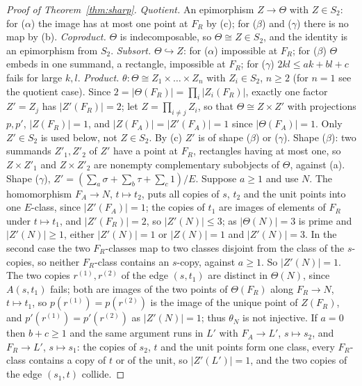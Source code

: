\documentclass[11pt]{amsart}
\theoremstyle{definition}
\begin{document}
\begin{proof}[Proof of Theorem~\ref{thm:sharp}]
\emph{Quotient.} An epimorphism $Z\to\Theta$ with $Z\in S_2$: for
($\alpha$) the image has at most one point at $F_R$ by (c); for ($\beta$)
and ($\gamma$) there is no map by (b).
\emph{Coproduct.} $\Theta$ is indecomposable, so $\Theta\cong Z\in S_2$,
and the identity is an epimorphism from $S_2$.
\emph{Subsort.} $\Theta\hookrightarrow Z$: for ($\alpha$) impossible at
$F_R$; for ($\beta$) $\Theta$ embeds in one summand, a rectangle, impossible at $F_R$;
for ($\gamma$) $2kl\le ak+bl+c$ fails for large $k,l$.
\emph{Product.} $\theta\colon\Theta\cong Z_1\times\dots\times Z_n$ with
$Z_i\in S_2$, $n\ge2$ (for $n=1$ see the quotient case). Since
$2=|\Theta(F_R)|=\prod_i|Z_i(F_R)|$, exactly one factor $Z'=Z_j$ has
$|Z'(F_R)|=2$; let $Z=\prod_{i\ne j}Z_i$, so that $\Theta\cong Z\times
Z'$ with projections $p,p'$, $|Z(F_R)|=1$, and $|Z(F_A)|=|Z'(F_A)|=1$
since $|\Theta(F_A)|=1$. Only $Z'\in S_2$ is used below, not $Z\in S_2$.
By (c) $Z'$ is of shape ($\beta$) or ($\gamma$). Shape ($\beta$): two
summands $Z'_1,Z'_2$ of $Z'$ have a point at $F_R$, rectangles having
at most one,
so $Z\times Z'_1$ and $Z\times Z'_2$ are nonempty complementary
subobjects of $\Theta$, against (a). Shape ($\gamma$), $Z'=(\sum_a\sigma
+\sum_b\tau+\sum_c 1)/E$. Suppose $a\ge1$ and use $N$. The homomorphism
$F_A\to N$, $t\mapsto t_2$, puts all copies of $s$, $t_2$ and the unit
points into one $E$-class, since $|Z'(F_A)|=1$; the copies of $t_1$ are
images of elements of $F_R$ under $t\mapsto t_1$, and $|Z'(F_R)|=2$, so
$|Z'(N)|\le3$; as $|\Theta(N)|=3$ is prime and $|Z'(N)|\ge1$, either
$|Z'(N)|=1$ or $|Z(N)|=1$ and $|Z'(N)|=3$. In the second case the two
$F_R$-classes map to two classes disjoint from the class of the
$s$-copies, so neither $F_R$-class contains an $s$-copy, against
$a\ge1$. So $|Z'(N)|=1$. The two copies $r^{(1)},r^{(2)}$ of the edge
$(s,t_1)$ are distinct in $\Theta(N)$, since $A(s,t_1)$ fails; both are
images of the two points of $\Theta(F_R)$ along $F_R\to N$, $t\mapsto
t_1$, so $p(r^{(1)})=p(r^{(2)})$ is the image of the unique point of
$Z(F_R)$, and $p'(r^{(1)})=p'(r^{(2)})$ as $|Z'(N)|=1$; thus $\theta_N$
is not injective. If $a=0$ then $b+c\ge1$ and the same argument runs
in $L'$ with $F_A\to L'$, $s\mapsto s_2$, and $F_R\to L'$, $s\mapsto s_1$:
the copies of $s_2$, $t$ and the unit points form one class, every
$F_R$-class contains a copy of $t$ or of the unit, so $|Z'(L')|=1$, and
the two copies of the edge $(s_1,t)$ collide.
\end{proof}
\end{document}
